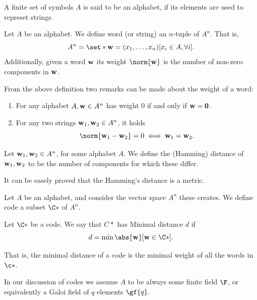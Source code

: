 \documentclass{subfiles}
\begin{document}
    \begin{definition*}
        A finite set of symbols \(A\) is said to be an alphabet,
            if its elements are used to represet strings.
    \end{definition*}

    \begin{definition*}
        Let \(A\) be an alphabet. We define word (or string) an \(n\)-tuple of 
            \(A^{n}\). That is, 
            \[
                A^{n} = \set*{\bv{w} = (x_{1}, \ldots, x_{n})}[x_{i} \in A, \forall i].
            \]
        Additionally, given a word \(\mathbf{w}\) its weight \(\norm{\bv{w}}\) is the number of
            non-zero components in \(\mathbf{w}\).
    \end{definition*}

    From the above definition two remarks can be made about the weight of a word:
        \begin{enumerate}
            \item For any alphabet \(A, \mathbf{w} \in A^{n}\) has weight 0 if and only if 
                \(\mathbf{w} = \mathbf{0}\).

            \item For any two strings \(\mathbf{w}_{1}, \mathbf{w}_{2} \in A^{n}\), it holds
                \[
                    \norm{\bv{w}_{1} - \bv{w}_{2}} = 0 \iff \bv{w}_{1} = \bv{w}_{2}.
                \]
        \end{enumerate}

    \begin{definition*}
        Let \(\mathbf{w}_{1}, \mathbf{w}_{2} \in A^{n}\), for some alphabet \(A\).
            We define the (Hamming) distance of \(\mathbf{w}_{1}, \mathbf{w}_{2}\)
            to be the number of components for which these differ.
    \end{definition*}
    \begin{remark*}
        It can be easely proved that the Hamming's distance is a metric.
    \end{remark*}

    \begin{definition*}[Code]
        Let \(A\) be an alphabet, and consider the vector space \(A^{n}\) these creates.
            We define code a subset \(\C*\) of \(A^{n}\).
    \end{definition*}

    \begin{definition*}
        Let \(\C*\) be a code. We say that \(C*\) has Minimal distance \(d\)
        if 
        \[
            d = \min{\abs{\bv{w}}}[\bv{w} \in \C*].
        \]
    \end{definition*}

    That is, the minimal distance of a code is the minimal weight of all the words in \(\c*\).

    In our discussion of codes we assume \(A\) to be always some finite field \(\F\),
    or equivalently a Galoi field of \(q\) elements \(\gf{q}\).
    \clearpage
\end{document}
